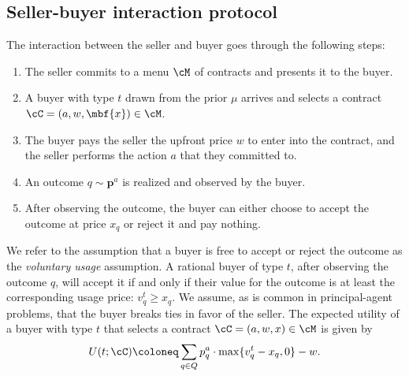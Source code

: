 \subsection{Seller-buyer interaction protocol} \label{interaction}

The interaction between the seller and buyer goes through the following steps:

\begin{enumerate}
    \item The seller commits to a menu $\cM $ of contracts and presents it to the buyer.
    
    \item A buyer with type $t$ drawn from the prior $\mu$ arrives and selects a contract $\cC = (a, w, \mbf{x}) \in \cM$.
    
    \item The buyer pays the seller the upfront price $w$ to enter into the contract, and the seller performs the action $a$ that they committed to.
    
    \item An outcome $q\sim \mathbf{p}^a$ is realized and observed by the buyer.
    
    \item After observing the outcome, the buyer can either choose to accept the outcome at price $x_q$ or reject it and pay nothing. 
\end{enumerate}



 We refer to the assumption that a buyer is free to accept or reject the outcome as the \emph{voluntary usage} assumption. A rational buyer of type $t$, after observing the outcome $q$, will accept it if and only if their value for the outcome is at least the corresponding usage price: $v_q^t \geq x_q$. We assume, as is common in  principal-agent problems, that the buyer breaks ties in favor of the seller. The expected utility of a buyer with type $t$ that selects a contract $\cC = (a, w, x) \in \cM$ is given by
$$U(t; \cC) \coloneq \sum_{q\in Q}  p^{a}_q \cdot  \max\{v^t_q - x_q, 0\} - w.$$ 



